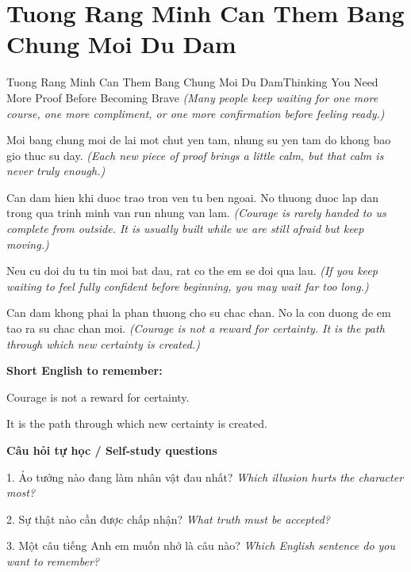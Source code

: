 \section{Tuong Rang Minh Can Them Bang Chung Moi Du Dam}
\begin{truyen}{Tuong Rang Minh Can Them Bang Chung Moi Du Dam}{Thinking You Need More Proof Before Becoming Brave}
\textit{(Many people keep waiting for one more course, one more compliment, or one more confirmation before feeling ready.)}

Moi bang chung moi de lai mot chut yen tam, nhung su yen tam do khong bao gio thuc su day.
\textit{(Each new piece of proof brings a little calm, but that calm is never truly enough.)}

Can dam hien khi duoc trao tron ven tu ben ngoai. No thuong duoc lap dan trong qua trinh minh van run nhung van lam.
\textit{(Courage is rarely handed to us complete from outside. It is usually built while we are still afraid but keep moving.)}

Neu cu doi du tu tin moi bat dau, rat co the em se doi qua lau.
\textit{(If you keep waiting to feel fully confident before beginning, you may wait far too long.)}

\end{truyen}

\begin{baihoc}
Can dam khong phai la phan thuong cho su chac chan. No la con duong de em tao ra su chac chan moi.
\textit{(Courage is not a reward for certainty. It is the path through which new certainty is created.)}
\end{baihoc}

\begin{ghinhoanh}
\textbf{Short English to remember:}

Courage is not a reward for certainty.

It is the path through which new certainty is created.

\end{ghinhoanh}

\begin{tuhocnhanh}
\textbf{Câu hỏi tự học / Self-study questions}

1. Ảo tưởng nào đang làm nhân vật đau nhất? \textit{Which illusion hurts the character most?}

2. Sự thật nào cần được chấp nhận? \textit{What truth must be accepted?}

3. Một câu tiếng Anh em muốn nhớ là câu nào? \textit{Which English sentence do you want to remember?}
\end{tuhocnhanh}
\ngancach

